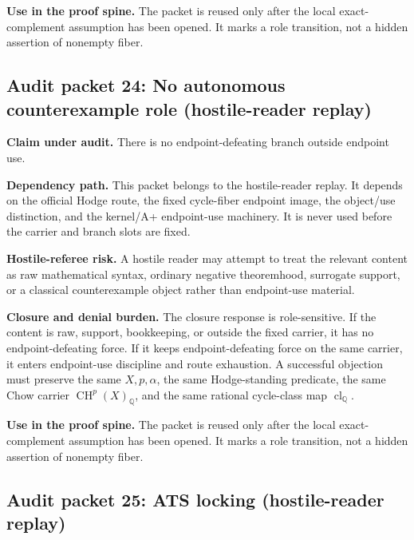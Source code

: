 \documentclass[11pt]{article}
\newcommand{\QQ}{\mathbb{Q}}
\newcommand{\CH}{\operatorname{CH}}
\newcommand{\clQ}{\operatorname{cl}_{\QQ}}
\begin{document}
\par\noindent\textbf{Use in the proof spine.} The packet is reused only after the local exact-complement assumption has been opened. It marks a role transition, not a hidden assertion of nonempty fiber.


\subsection{Audit packet 24: No autonomous counterexample role (hostile-reader replay)}


\par\noindent\textbf{Claim under audit.} There is no endpoint-defeating branch outside endpoint use.


\par\noindent\textbf{Dependency path.} This packet belongs to the hostile-reader replay. It depends on the official Hodge route, the fixed cycle-fiber endpoint image, the object/use distinction, and the kernel/A+ endpoint-use machinery. It is never used before the carrier and branch slots are fixed.


\par\noindent\textbf{Hostile-referee risk.} A hostile reader may attempt to treat the relevant content as raw mathematical syntax, ordinary negative theoremhood, surrogate support, or a classical counterexample object rather than endpoint-use material.


\par\noindent\textbf{Closure and denial burden.} The closure response is role-sensitive. If the content is raw, support, bookkeeping, or outside the fixed carrier, it has no endpoint-defeating force. If it keeps endpoint-defeating force on the same carrier, it enters endpoint-use discipline and route exhaustion. A successful objection must preserve the same $X,p,\alpha$, the same Hodge-standing predicate, the same Chow carrier $\CH^p(X)_\QQ$, and the same rational cycle-class map $\clQ$.


\par\noindent\textbf{Use in the proof spine.} The packet is reused only after the local exact-complement assumption has been opened. It marks a role transition, not a hidden assertion of nonempty fiber.


\subsection{Audit packet 25: ATS locking (hostile-reader replay)}
\end{document}
